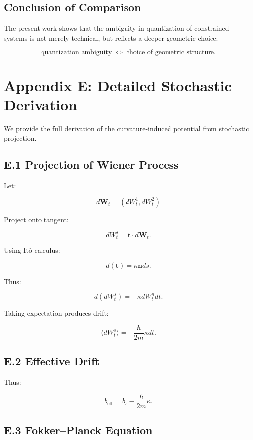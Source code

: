 \documentclass[11pt]{article}
\begin{document}
\subsection{Conclusion of Comparison}

The present work shows that the ambiguity in quantization of constrained systems is not merely technical, but reflects a deeper geometric choice:

\begin{equation}
\text{quantization ambiguity}
\;\Longleftrightarrow\;
\text{choice of geometric structure}.
\end{equation}

\section*{Appendix E: Detailed Stochastic Derivation}

We provide the full derivation of the curvature-induced potential from stochastic projection.

\subsection*{E.1 Projection of Wiener Process}

Let:

\[
d\mathbf{W}_t = (dW_t^1, dW_t^2)
\]

Project onto tangent:

\[
dW_t^s = \mathbf{t} \cdot d\mathbf{W}_t.
\]

Using It\^o calculus:

\[
d(\mathbf{t}) = \kappa \mathbf{n} ds.
\]

Thus:

\[
d(dW_t^s) = -\kappa dW_t^n dt.
\]

Taking expectation produces drift:

\[
\langle dW_t^s \rangle = -\frac{\hbar}{2m}\kappa dt.
\]

\subsection*{E.2 Effective Drift}

Thus:

\[
b_{\mathrm{eff}} = b_s - \frac{\hbar}{2m}\kappa.
\]

\subsection*{E.3 Fokker--Planck Equation}
\end{document}
